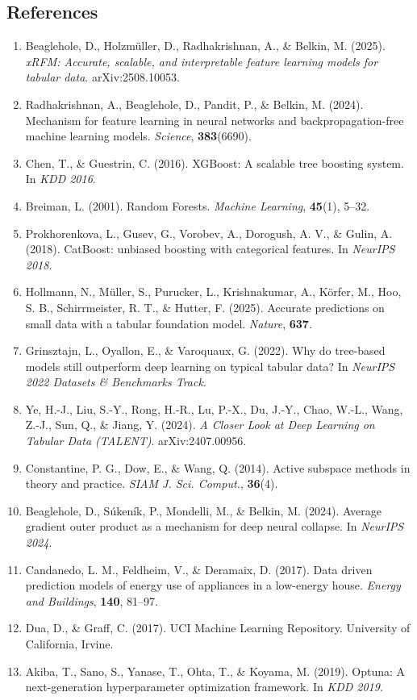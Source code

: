 \documentclass[
  11pt,
  onecolumn]{article}
\providecommand{\tightlist}{%
  \setlength{\itemsep}{0pt}\setlength{\parskip}{0pt}}
\begin{document}
\subsection{References}\label{references}

\begin{enumerate}
\def\labelenumi{\arabic{enumi}.}
\tightlist
\item
  Beaglehole, D., Holzmüller, D., Radhakrishnan, A., \& Belkin, M.
  (2025). \emph{xRFM: Accurate, scalable, and interpretable feature
  learning models for tabular data}. arXiv:2508.10053.
\item
  Radhakrishnan, A., Beaglehole, D., Pandit, P., \& Belkin, M. (2024).
  Mechanism for feature learning in neural networks and
  backpropagation-free machine learning models. \emph{Science},
  \textbf{383}(6690).
\item
  Chen, T., \& Guestrin, C. (2016). XGBoost: A scalable tree boosting
  system. In \emph{KDD 2016}.
\item
  Breiman, L. (2001). Random Forests. \emph{Machine Learning},
  \textbf{45}(1), 5--32.
\item
  Prokhorenkova, L., Gusev, G., Vorobev, A., Dorogush, A. V., \& Gulin,
  A. (2018). CatBoost: unbiased boosting with categorical features. In
  \emph{NeurIPS 2018}.
\item
  Hollmann, N., Müller, S., Purucker, L., Krishnakumar, A., Körfer, M.,
  Hoo, S. B., Schirrmeister, R. T., \& Hutter, F. (2025). Accurate
  predictions on small data with a tabular foundation model.
  \emph{Nature}, \textbf{637}.
\item
  Grinsztajn, L., Oyallon, E., \& Varoquaux, G. (2022). Why do
  tree-based models still outperform deep learning on typical tabular
  data? In \emph{NeurIPS 2022 Datasets \& Benchmarks Track}.
\item
  Ye, H.-J., Liu, S.-Y., Rong, H.-R., Lu, P.-X., Du, J.-Y., Chao, W.-L.,
  Wang, Z.-J., Sun, Q., \& Jiang, Y. (2024). \emph{A Closer Look at Deep
  Learning on Tabular Data (TALENT)}. arXiv:2407.00956.
\item
  Constantine, P. G., Dow, E., \& Wang, Q. (2014). Active subspace
  methods in theory and practice. \emph{SIAM J. Sci. Comput.},
  \textbf{36}(4).
\item
  Beaglehole, D., Súkeník, P., Mondelli, M., \& Belkin, M. (2024).
  Average gradient outer product as a mechanism for deep neural
  collapse. In \emph{NeurIPS 2024}.
\item
  Candanedo, L. M., Feldheim, V., \& Deramaix, D. (2017). Data driven
  prediction models of energy use of appliances in a low-energy house.
  \emph{Energy and Buildings}, \textbf{140}, 81--97.
\item
  Dua, D., \& Graff, C. (2017). UCI Machine Learning Repository.
  University of California, Irvine.
\item
  Akiba, T., Sano, S., Yanase, T., Ohta, T., \& Koyama, M. (2019).
  Optuna: A next-generation hyperparameter optimization framework. In
  \emph{KDD 2019}.
\end{enumerate}
\end{document}
